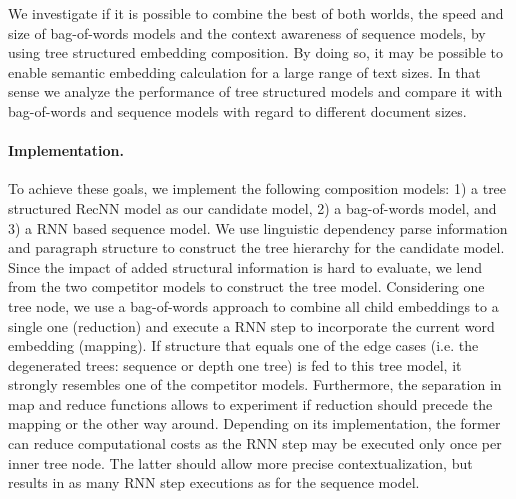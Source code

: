 We investigate if it is possible to combine the best of both worlds, the speed and size of bag-of-words models and the context awareness of sequence models, by using tree structured embedding composition. By doing so, it may be possible to enable semantic embedding calculation for a large range of text sizes. In that sense we analyze the performance of tree structured models and compare it with bag-of-words and sequence models with regard to different document sizes.

\paragraph{Implementation.} To achieve these goals, we implement the following composition models: 1) a tree structured \ac{RecNN} model as our candidate model, 2) a bag-of-words model, and 3) a %
\ac{RNN} based sequence model. We use linguistic dependency parse information and paragraph structure to construct the tree hierarchy for the candidate model. Since the impact of added structural information is hard to evaluate, we lend from the two competitor models to construct the tree model. Considering one tree node, we use a bag-of-words approach to combine all child embeddings to a single one (reduction) and execute a \ac{RNN} step to incorporate the current word embedding (mapping).
If structure that equals one of the edge cases (i.e. the degenerated trees: sequence or depth one tree) is fed to this tree model, it strongly resembles one of the competitor models. Furthermore, the separation in map and reduce functions allows to experiment if reduction should precede the mapping or the other way around. Depending on its implementation, the former can reduce computational costs as the \ac{RNN} step may be executed only once per inner tree node. The latter should allow more precise contextualization, but results in as many \ac{RNN} step executions as for the sequence model. 

